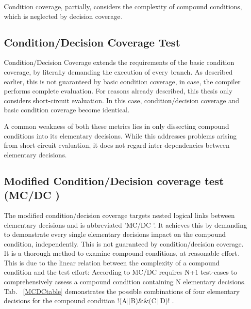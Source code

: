 	Condition coverage, partially, considers the complexity of compound conditions, which is neglected by decision coverage.
	
	\subsection{Condition/Decision Coverage Test}
	Condition/Decision Coverage extends the requirements of the basic condition coverage, by literally demanding the execution of every branch. As described earlier, this is not guaranteed by basic condition coverage, in case, the compiler performs complete evaluation. For reasons already described, this thesis only considers short-circuit evaluation. In this case, condition/decision coverage and basic condition coverage become identical.

	A common weakness of both these metrics lies in only dissecting compound conditions into its elementary decisions. While this addresses problems arising from short-circuit evaluation, it does not regard inter-dependencies between elementary decisions.
	
	\newcommand{\mcdc}{MC/DC }
	\subsection{Modified Condition/Decision coverage test (\mcdc)}
	The modified condition/decision coverage targets nested logical links between elementary decisions and is abbreviated '\mcdc'. It achieves this by demanding to demonstrate every single elementary decisions impact on the compound condition, independently. This is not guaranteed by condition/decision coverage. It is a thorough method to examine compound conditions, at reasonable effort. This is due to the linear relation between the complexity of a compound condition and the test effort: According to \cite{ChilenskiMiller1994} \mcdc requires N+1 test-cases to comprehensively assess a compound condition containing N elementary decisions. \\

	Tab. ~\ref{MCDCtable} demonstrates the possible combinations of four elementary decisions for the compound condition \lstC !(A||B)\&\&(C||D)! .

